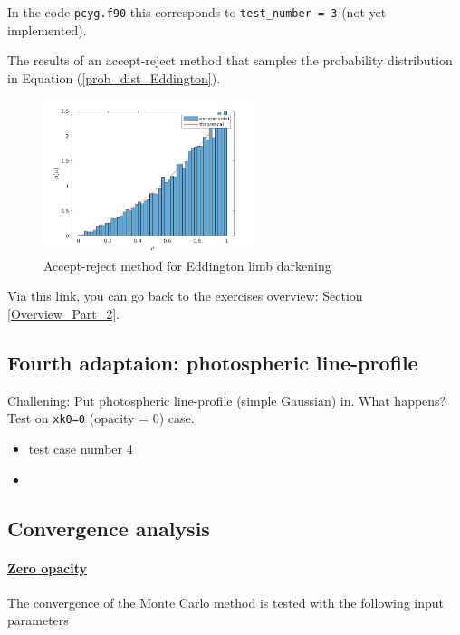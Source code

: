 \documentclass[../main/main.tex]{subfiles}
\begin{document}
\begin{enumerate}
In the code \texttt{pcyg.f90} this corresponds to \texttt{test\_number = 3} (not yet implemented). 

The results of an accept-reject method that samples the probability distribution in Equation (\ref{prob_dist_Eddington}).

\begin{figure}[!htp]
\centering
\includegraphics[width=0.55\textwidth]{../../introductory_exercises/P_Cygni_profile_UV_resonance/data/Eddington_accept_reject.png}
\caption{Accept-reject method for Eddington limb darkening}
\end{figure}
\end{enumerate}

Via this link, you can go back to the exercises overview: Section \underline{\ref{Overview_Part_2}}.

\newpage
\subsection{Fourth adaptaion: photospheric line-profile}
Challening: Put photospheric line-profile (simple Gaussian) in. What happens? Test on \texttt{xk0=0} (opacity = 0) case.

\begin{itemize}
\item test case number 4 
\item \noindent{}
\end{itemize}

\newpage
\subsection{Convergence analysis}
\label{convergence_analysis}

\paragraph{\underline{Zero opacity}}
The convergence of the Monte Carlo method is tested with the following input parameters
\end{document}
